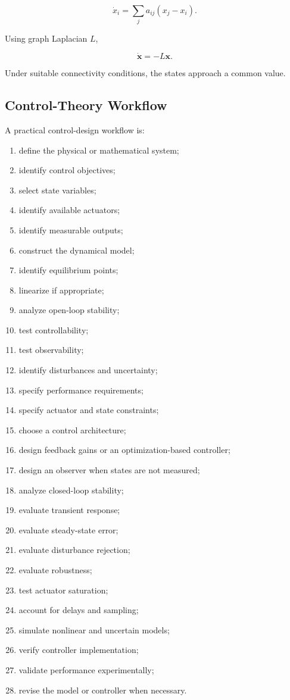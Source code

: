 \[
\boxed{
\dot{x}_i
=
\sum_j
a_{ij}
(x_j-x_i).
}
\]

Using graph Laplacian \(L\),

\[
\boxed{
\dot{\mathbf{x}}
=
-L\mathbf{x}.
}
\]

Under suitable connectivity conditions, the states approach a common value.

\subsection{Control-Theory Workflow}
\label{subsec:control-theory-workflow}

A practical control-design workflow is:

\begin{enumerate}
    \item define the physical or mathematical system;
    \item identify control objectives;
    \item select state variables;
    \item identify available actuators;
    \item identify measurable outputs;
    \item construct the dynamical model;
    \item identify equilibrium points;
    \item linearize if appropriate;
    \item analyze open-loop stability;
    \item test controllability;
    \item test observability;
    \item identify disturbances and uncertainty;
    \item specify performance requirements;
    \item specify actuator and state constraints;
    \item choose a control architecture;
    \item design feedback gains or an optimization-based controller;
    \item design an observer when states are not measured;
    \item analyze closed-loop stability;
    \item evaluate transient response;
    \item evaluate steady-state error;
    \item evaluate disturbance rejection;
    \item evaluate robustness;
    \item test actuator saturation;
    \item account for delays and sampling;
    \item simulate nonlinear and uncertain models;
    \item verify controller implementation;
    \item validate performance experimentally;
    \item revise the model or controller when necessary.
\end{enumerate}

